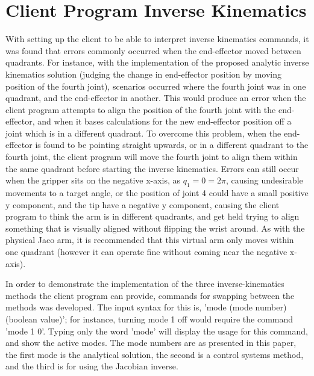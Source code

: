 \documentclass[12pt,openany,a4paper]{book}
\begin{document}
\section{Client Program Inverse Kinematics}
With setting up the client to be able to interpret inverse kinematics commands, it was found that errors commonly occurred when the end-effector moved between quadrants.  For instance, with the implementation of the proposed analytic inverse kinematics solution (judging the change in end-effector position by moving position of the fourth joint), scenarios occurred where the fourth joint was in one quadrant, and the end-effector in another. This would produce an error when the client program attempts to align the position of the fourth joint with the end-effector, and when it bases calculations for the new end-effector position off a joint which is in a different quadrant. To overcome this problem, when the end-effector is found to be pointing straight upwards, or in a different quadrant to the fourth joint, the client program will move the fourth joint to align them within the same quadrant before starting the inverse kinematics. Errors can still occur when the gripper sits on the negative x-axis, as $q_1 = 0 = 2\pi$, causing undesirable movements to a target angle, or the position of joint 4 could have a small positive y component, and the tip have a negative y component, causing the client program to think the arm is in different quadrants, and get held trying to align something that is visually aligned without flipping the wrist around. As with the physical Jaco arm, it is recommended that this virtual arm only moves within one quadrant (however it can operate fine without coming near the negative x-axis).


In order to demonstrate the implementation of the three inverse-kinematics methods the client program can provide, commands for swapping between the methods was developed. The input syntax for this is, 'mode (mode number) (boolean value)'; for instance, turning mode 1 off would require the command 'mode 1 0'. Typing only the word 'mode' will display the usage for this command, and show the active modes. The mode numbers are as presented in this paper, the first mode is the analytical solution, the second is a control systems method, and the third is for using the Jacobian inverse.
\end{document}
